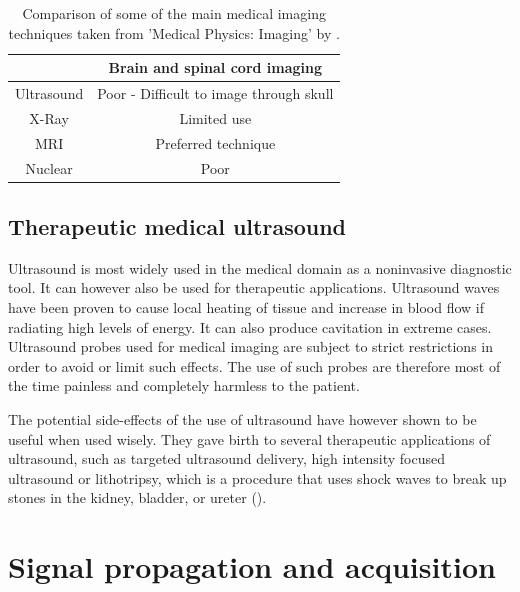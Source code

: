 \begin{table}[!ht]
\begin{tabular}{| c || c |}
  \hline\hline
  
    &   Brain and spinal cord imaging   \\
  \hline
  Ultrasound  & Poor - Difficult to image through skull \\
  X-Ray & Limited use \\
  MRI   & Preferred technique \\
  Nuclear   & Poor \\
  \hline
 \end{tabular}
\caption[Comparison of some of the main medical imaging techniques.]{Comparison of some of the main medical imaging techniques taken from 'Medical Physics: Imaging' by \cite{medical_physics}.}
\label{table:medical_imaging}
\end{table}

\subsection{Therapeutic medical ultrasound}
Ultrasound is most widely used in the medical domain as a noninvasive diagnostic tool. It can however also be used for therapeutic applications. Ultrasound waves have been proven to cause local heating of tissue and increase in blood flow if radiating high levels of energy. It can also produce cavitation in extreme cases.
Ultrasound probes used for medical imaging are subject to strict restrictions in order to avoid or limit such effects. The use of such probes are therefore most of the time painless and completely harmless to the patient.

The potential side-effects of the use of ultrasound have however shown to be useful when used wisely. They gave birth to several therapeutic applications of ultrasound, such as targeted ultrasound delivery, high intensity focused ultrasound or lithotripsy, which is a procedure that uses shock waves to break up stones in the kidney, bladder, or ureter (\cite{lithotripsy}).

\section{Signal propagation and acquisition}
\label{sec:signals}

